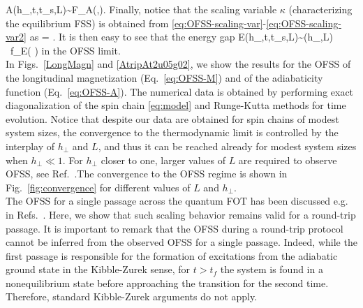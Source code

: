 \be\label{eq:OFSS-A}
A(h_\perp,t,t_s,L)\sim {\cal F}_A(\tau,\upsilon).
\ee
Finally, notice that the scaling variable $\kappa$ (characterizing the equilibrium FSS) is obtained from \eqref{eq:OFSS-scaling-var}-\eqref{eq:OFSS-scaling-var2} as
\be\label{eq:kappa-ofss}
\kappa = {\frac{2\tau}{\sqrt{\upsilon}}}.
\ee
It is then easy to see that the energy gap 
\be
\Delta E(h_\perp,t,t_s,L)\sim \Delta(h_\perp,L) \ f_E\left( {\frac{2\tau}{\sqrt{\upsilon}}}\right)
\ee
 in the OFSS limit.\\

In Figs.~\ref{LongMagn} and \ref{AtripAt2u05g02}, we show the results for the OFSS of the longitudinal magnetization (Eq.~\eqref{eq:OFSS-M}) and of the adiabaticity function (Eq.~\eqref{eq:OFSS-A}). The numerical data is obtained by performing exact diagonalization of the spin chain \eqref{eq:model} and Runge-Kutta methods for time evolution. Notice that despite our data are obtained for spin chains of modest system sizes, the convergence to the thermodynamic limit is controlled by the interplay of $h_\perp$ and $L$, and thus it can be reached already for modest system sizes when $h_\perp\ll 1$. For $h_\perp$ closer to one, larger values of $L$ are required to observe OFSS, see Ref.~\cite{campostrini2014finite,campostrini2015finite}.The convergence to the OFSS regime is shown in Fig.~\ref{fig:convergence} for different values of $L$ and $h_\perp$.\\



The OFSS for a single passage across the quantum FOT has been discussed e.g. in Refs.~\cite{pelissetto2018out,sinha2021nonadiabatic,coulamy2017dynamics,shimizu2018dynamics,qiu2020observation,rossini2020dynamic}. Here, we show that such scaling behavior remains valid for a round-trip passage. It is important to remark that the OFSS during a round-trip protocol cannot be inferred from the observed OFSS for a single passage. Indeed,  while the first passage is responsible for the formation of excitations from the adiabatic ground state in the Kibble-Zurek sense, for $t>t_f$ the system is found in a nonequilibrium state before approaching the transition for the second time. Therefore, standard Kibble-Zurek arguments do not apply.\\

